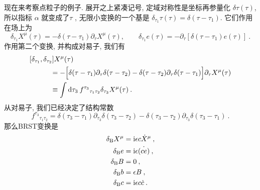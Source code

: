 现在来考察点粒子的例子. 展开之上紧凑记号, 定域对称性是坐标再参量化 $\delta \tau(\tau)$, 所以指标 $\alpha$ 就变成了$\tau$ , 无限小变换的一个基是 $\delta_{\tau_{1}} \tau(\tau)=\delta(\tau-\tau_{1})$. 它们作用在场上为
\begin{equation}
	\delta_{\tau_{1}} X^{\mu}(\tau)=-\delta(\tau-\tau_{1}) \partial_{\tau} X^{\mu}(\tau), \qquad 
	\delta_{\tau_{1}} e(\tau)=-\partial_{\tau}[\delta(\tau-\tau_{1}) e(\tau)] \:. \label{4.2.19}
\end{equation}
作用第二个变换, 并构成对易子, 我们有
\begin{align}
		&[\delta_{\tau_{1}}, \delta_{\tau_{2}}] X^{\mu}(\tau) \nonumber  \\
		&\qquad\quad =-\Bigl[\delta(\tau-\tau_{1}) \partial_{\tau} \delta(\tau-\tau_{2})-\delta(\tau-\tau_{2}) \partial_{\tau} \delta(\tau-\tau_{1})\Bigr] \partial_{\tau} X^{\mu}(\tau) \nonumber  \\
		&\qquad\quad  \equiv \int \mathrm{d} \tau_{3}\: f^{\tau_{3}}{}_{\tau_{1} \tau_{2}} \delta_{\tau_{3}} X^{\mu}(\tau) \:. \label{4.2.20}
\end{align}
从对易子, 我们已经决定了结构常数
\begin{equation}
	f^{\tau_{3}}{}_{\tau_{1} \tau_{2}}=\delta(\tau_{3}-\tau_{1}) \partial_{\tau_{3}} \delta(\tau_{3}-\tau_{2})
	-\delta(\tau_{3}-\tau_{2}) \partial_{\tau_{3}} \delta(\tau_{3}-\tau_{1}) \:. \label{4.2.21}
\end{equation}
那么BRST变换是
\begin{subequations}
\begin{align}
\delta_{\mathrm{B}} X^{\mu}&=\mathrm{i} \epsilon c \dot{X}^{\mu} \:, \label{4.2.22a} \\
\delta_{\mathrm{B}} e&=\mathrm{i} \epsilon\dot{(c e)} \:, \label{4.2.22b} \\
\delta_{\mathrm{B}} B&=0 \:, \label{4.2.22c} \\
\delta_{\mathrm{B}} b&=\epsilon B \:, \label{4.2.22d} \\
\delta_{\mathrm{B}} c&=\mathrm{i} \epsilon c \dot{c} \:. \label{4.2.22e} 
\end{align}
\end{subequations}

